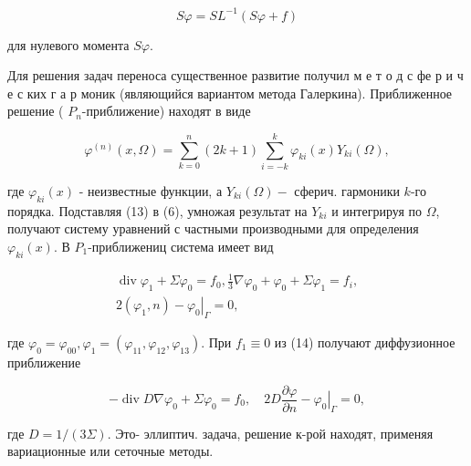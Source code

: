 \documentclass[10pt]{article}
\begin{document}
\[

S \varphi=S L^{-1}(S \varphi+f)

\]



для нулевого момента $S \varphi$.



Для решения задач переноса существенное развитие получил м е т о д с фе р и ч е с ких г а р моник (являющийся вариантом метода Галеркина). Приближенное решение ( $P_{n}$-приближение) находят в виде



\[

\varphi^{(n)}(x, \Omega)=\sum_{k=0}^{n}(2 k+1) \sum_{i=-k}^{k} \varphi_{k i}(x) Y_{k i}(\Omega),

\]



где $\varphi_{k i}(x)$ - неизвестные функции, а $Y_{k i}(\Omega)-$ сферич. гармоники $k$-го порядка. Подставляя (13) в (6), умножая результат на $Y_{k i}$ и интегрируя по $\Omega$, получают систему уравнений с частными производными для определения $\varphi_{k i}(x)$. В $P_{1}$-приближениц система имеет вид



\[

\begin{gathered}

\operatorname{div} \varphi_{1}+\Sigma \varphi_{0}=f_{0}, \frac{1}{3} \nabla \varphi_{0}+\varphi_{0}+\Sigma \varphi_{1}=f_{i}, \\

2\left(\varphi_{1}, n\right)-\left.\varphi_{0}\right|_{\Gamma}=0,

\end{gathered}

\]



где $\varphi_{0}=\varphi_{00}, \varphi_{1}=\left(\varphi_{11}, \varphi_{12}, \varphi_{13}\right)$. При $f_{1} \equiv 0$ из (14) получают диффузионное приближение



\[

-\operatorname{div} D \nabla \varphi_{0}+\Sigma \varphi_{0}=f_{0}, \quad 2 D \frac{\partial \varphi}{\partial n}-\left.\varphi_{0}\right|_{\Gamma}=0,

\]



где $D=1 /(3 \Sigma)$. Это- эллиптич. задача, решение к-рой находят, применяя вариационные или сеточные методы.
\end{document}
